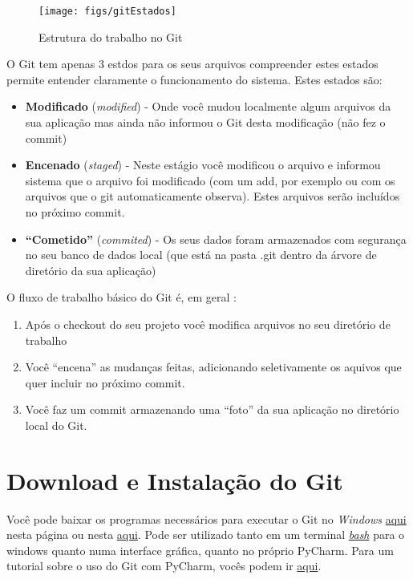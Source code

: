 \documentclass[12pt,a4paper]{article}
\begin{document}
\begin{figure}
	\centering
	\texttt{[image: figs/gitEstados]}
	\caption{Estrutura do trabalho no Git \citep[p. 16]{Chacon2014}}
	\label{fig:gitestados}
\end{figure}


O Git tem apenas 3 estdos para os seus arquivos compreender estes estados permite entender claramente o funcionamento do sistema. Estes estados são:
\begin{itemize}
	\item \textbf{Modificado} (\textit{modified}) - Onde você mudou localmente algum arquivos da sua aplicação mas ainda não informou o Git desta modificação (não fez o commit)
	\item \textbf{Encenado} (\textit{staged}) - Neste estágio você modificou o arquivo e informou sistema que o arquivo foi modificado (com um add, por exemplo ou com os arquivos que o git automaticamente observa). Estes arquivos serão incluídos no próximo commit.
	\item \textbf{``Cometido''} (\textit{commited}) - Os seus dados foram armazenados com segurança no seu banco de dados local (que está na pasta .git  dentro da árvore de diretório da sua aplicação)
\end{itemize}

O fluxo de trabalho básico do Git é, em geral \citep[p.16]{Chacon2014}: 
\begin{enumerate}
	\item Após o checkout do seu projeto você modifica arquivos no seu diretório de trabalho
	\item Você ``encena'' as mudanças feitas, adicionando seletivamente os aquivos que quer incluir no próximo commit.
	\item Você faz um commit armazenando uma ``foto'' da sua aplicação no diretório local do Git.
\end{enumerate}

\section{Download e Instalação do Git} 


Você pode baixar os programas necessários para executar o Git no \textit{Windows} \href{https://gitforwindows.org/}{aqui} nesta página ou nesta \href{https://git-scm.com/download/win}{aqui}. Pode ser utilizado tanto em um terminal \href{https://www.laptopmag.com/articles/use-bash-shell-windows-10}{\textit{bash}}  para o windows quanto numa interface gráfica, quanto no próprio PyCharm. Para um tutorial sobre o uso do Git com PyCharm, vocês podem ir \href{https://blog.softhints.com/pycharm-version-control-and-git-complete-tutorial/}{aqui}.
\end{document}
